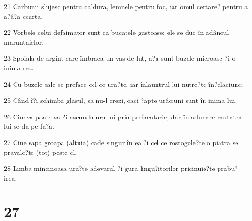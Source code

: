 \par 21 Carbunii slujesc pentru caldura, lemnele pentru foc, iar omul certare? pentru a a?â?a cearta.
\par 22 Vorbele celui defaimator sunt ca bucatele gustoase; ele se duc în adâncul maruntaielor.
\par 23 Spoiala de argint care îmbraca un vas de lut, a?a sunt buzele mieroase ?i o inima rea.
\par 24 Cu buzele sale se preface cel ce ura?te, iar înlauntrul lui nutre?te în?elaciune;
\par 25 Când î?i schimba glasul, sa nu-l crezi, caci ?apte urâciuni sunt în inima lui.
\par 26 Cineva poate sa-?i ascunda ura lui prin prefacatorie, dar în adunare rautatea lui se da pe fa?a.
\par 27 Cine sapa groapa (altuia) cade singur în ea ?i cel ce rostogole?te o piatra se pravale?te (tot) peste el.
\par 28 Limba mincinoasa ura?te adevarul ?i gura lingu?itorilor pricinuie?te prabu?irea.

\chapter{27}


